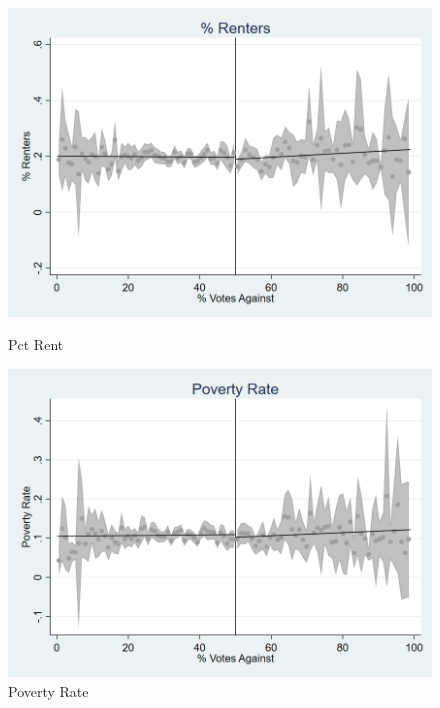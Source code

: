 \begin{figure}[ht]
    \centering
    \begin{minipage}[b]{0.40\textwidth}
        \centering
        \includegraphics[width=\textwidth,keepaspectratio]{images/cov_smoothness_pctrent.png}
        \caption*{Pct Rent}
        \label{fig:pctrent_sm}
    \end{minipage}
    \hfill
    \begin{minipage}[b]{0.40\textwidth}
        \centering
        \includegraphics[width=\textwidth,keepaspectratio]{images/cov_smoothness_poverty.png}
        \caption*{Poverty Rate}
        \label{fig:poverty_sm}
    \end{minipage}
    
    

\end{figure}
